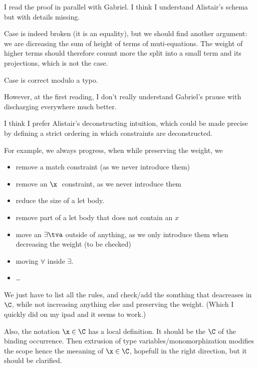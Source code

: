 \documentclass[acmsmall,screen,nonacm,review]{acmart}
\begin{document}
\begin{version}{\color{blue}\Xxx}
I read the proof in parallel with Gabriel.
I think I understand Alistair's schema but with details missing.

Case  is indeed broken (it is an equality), but we should find
another argument: we are dicreasing the sum of height of terms of
muti-equations. The weight of higher terms should therefore couunt more
the split into a small term and its projections, which is not the case.

Case  is correct modulo a typo.

However, at the first reading, I don't really understand Gabriel's prause
with discharging everywhere much better.

I think I prefer Alistair's deconstructing intuition, which could be made
precise by defining a strict ordering in which constraints are
deconstructed.

For example, we always progress, when while preserving the weight,
we
\begin{itemize}

\item remove a match constraint (as we never introduce them)
\item remove an $\x\;\t$ constraint, as we never introduce them
\item reduce the size of a let body.
\item remove part of a let body that does not contain an $x$
\item move an $\exists \tv$ outside of anything, as
      we only introduce them when decreasing the weight (to be checked)
\item moving $\forall$ inside $\exists$.
\item \ldots
\end{itemize}
We just have to list all the rules, and check/add the somthing
that deacreases in $\C$, while not increasing anything else
and preserving the weight. (Which I quickly did on
my ipad and it seems to work.)

Also, the notation $\x \in \C$ has a local definition. It should be the $\C$
of the binding occurrence. Then extrusion of type variables/monomorphization
modifies the scope hence the meeaning of $\x \in \C$, hopefull in the right
direction, but it should be clarified.
\end{version}
\end{document}
